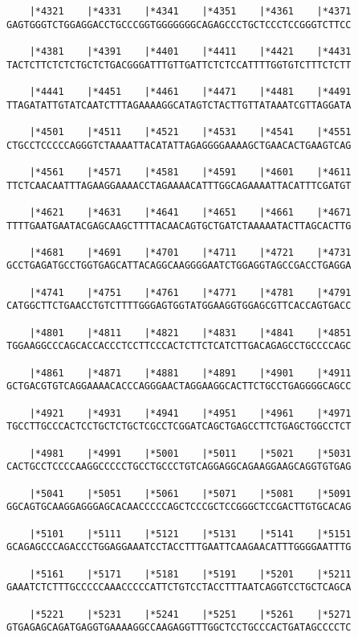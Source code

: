 \documentclass{article}
\begin{document}
\begin{Verbatim}
    |*4321    |*4331    |*4341    |*4351    |*4361    |*4371
GAGTGGGTCTGGAGGACCTGCCCGGTGGGGGGGCAGAGCCCTGCTCCCTCCGGGTCTTCC
  
    |*4381    |*4391    |*4401    |*4411    |*4421    |*4431
TACTCTTCTCTCTGCTCTGACGGGATTTGTTGATTCTCTCCATTTTGGTGTCTTTCTCTT
  
    |*4441    |*4451    |*4461    |*4471    |*4481    |*4491
TTAGATATTGTATCAATCTTTAGAAAAGGCATAGTCTACTTGTTATAAATCGTTAGGATA
  
    |*4501    |*4511    |*4521    |*4531    |*4541    |*4551
CTGCCTCCCCCAGGGTCTAAAATTACATATTAGAGGGGAAAAGCTGAACACTGAAGTCAG
  
    |*4561    |*4571    |*4581    |*4591    |*4601    |*4611
TTCTCAACAATTTAGAAGGAAAACCTAGAAAACATTTGGCAGAAAATTACATTTCGATGT
  
    |*4621    |*4631    |*4641    |*4651    |*4661    |*4671
TTTTGAATGAATACGAGCAAGCTTTTACAACAGTGCTGATCTAAAAATACTTAGCACTTG
  
    |*4681    |*4691    |*4701    |*4711    |*4721    |*4731
GCCTGAGATGCCTGGTGAGCATTACAGGCAAGGGGAATCTGGAGGTAGCCGACCTGAGGA
  
    |*4741    |*4751    |*4761    |*4771    |*4781    |*4791
CATGGCTTCTGAACCTGTCTTTTGGGAGTGGTATGGAAGGTGGAGCGTTCACCAGTGACC
  
    |*4801    |*4811    |*4821    |*4831    |*4841    |*4851
TGGAAGGCCCAGCACCACCCTCCTTCCCACTCTTCTCATCTTGACAGAGCCTGCCCCAGC
  
    |*4861    |*4871    |*4881    |*4891    |*4901    |*4911
GCTGACGTGTCAGGAAAACACCCAGGGAACTAGGAAGGCACTTCTGCCTGAGGGGCAGCC
  
    |*4921    |*4931    |*4941    |*4951    |*4961    |*4971
TGCCTTGCCCACTCCTGCTCTGCTCGCCTCGGATCAGCTGAGCCTTCTGAGCTGGCCTCT
  
    |*4981    |*4991    |*5001    |*5011    |*5021    |*5031
CACTGCCTCCCCAAGGCCCCCTGCCTGCCCTGTCAGGAGGCAGAAGGAAGCAGGTGTGAG
  
    |*5041    |*5051    |*5061    |*5071    |*5081    |*5091
GGCAGTGCAAGGAGGGAGCACAACCCCCAGCTCCCGCTCCGGGCTCCGACTTGTGCACAG
  
    |*5101    |*5111    |*5121    |*5131    |*5141    |*5151
GCAGAGCCCAGACCCTGGAGGAAATCCTACCTTTGAATTCAAGAACATTTGGGGAATTTG
  
    |*5161    |*5171    |*5181    |*5191    |*5201    |*5211
GAAATCTCTTTGCCCCCAAACCCCCATTCTGTCCTACCTTTAATCAGGTCCTGCTCAGCA
  
    |*5221    |*5231    |*5241    |*5251    |*5261    |*5271
GTGAGAGCAGATGAGGTGAAAAGGCCAAGAGGTTTGGCTCCTGCCCACTGATAGCCCCTC
  

\end{Verbatim}
\end{document}
